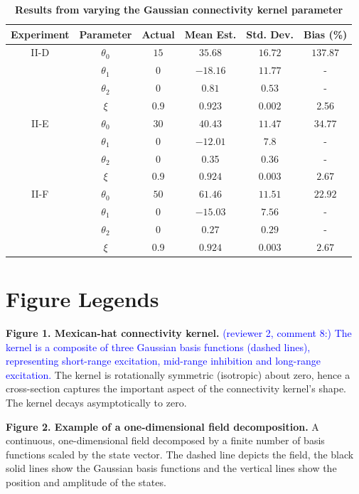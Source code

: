 \documentclass[review,authoryear,3p]{elsarticle}
\newcommand{\parham}[1]{\textcolor{blue}{#1}}
\begin{document}
\clearpage
\newpage
\begin{table}[!ht]
\begin{tabular}{c|ccccc}
	Experiment & Parameter & Actual & Mean Est. & Std. Dev. & Bias (\%) \\ \hline
	II-D &$\theta_0$ & $15$ & $35.68$ & $16.72$ & $137.87$ \\
	& $\theta_1$ & 0 & $-18.16$ & $11.77$ & - \\
	& $\theta_2$ & 0 & $0.81$ & $0.53$ & - \\
	& $\xi$ & 0.9 & 0.923 & $0.002$ & 2.56 \\ \hline	
	
 	II-E& $\theta_0$ & $30$ & $40.43$ & $11.47$ & $34.77$ \\
	& $\theta_1$ & 0 & $-12.01$ & $7.8$ & - \\
	& $\theta_2$ & 0 & 0.35 & $0.36$ & - \\
	& $\xi$ & 0.9 & $0.924$ & $0.003$ & $2.67$ \\ \hline
	
	II-F & $\theta_0$ & $50$ & $61.46$ & $11.51$ & $22.92$ \\
	& $\theta_1$ & 0 & $-15.03$ & $7.56$ & - \\
	& $\theta_2$ & 0 & $0.27$ & $0.29$ & - \\
	& $\xi$ & 0.9 & $0.924$ & $0.003$ & $2.67$ \\ \hline
\end{tabular}\label{tab:GaussianKernelResults}
\caption{\textbf{Results from varying the Gaussian connectivity kernel parameter}}
\end{table}

\doublespacing

\newpage
\clearpage
\section*{Figure Legends}
{\bf Figure 1. Mexican-hat connectivity kernel.} \parham{(reviewer 2, comment 8:) The kernel is a composite of three Gaussian basis functions (dashed lines), representing short-range excitation, mid-range inhibition and long-range excitation.} The kernel is rotationally symmetric (isotropic) about zero, hence a cross-section captures the important aspect of the connectivity kernel's shape. The kernel decays asymptotically to zero.

{\bf Figure 2. Example of a one-dimensional field decomposition.} A continuous, one-dimensional field decomposed by a finite number of basis functions scaled by the state vector. The dashed line depicts the field, the black solid lines show the Gaussian basis functions and the vertical lines show the position and amplitude of the states.
\end{document}
